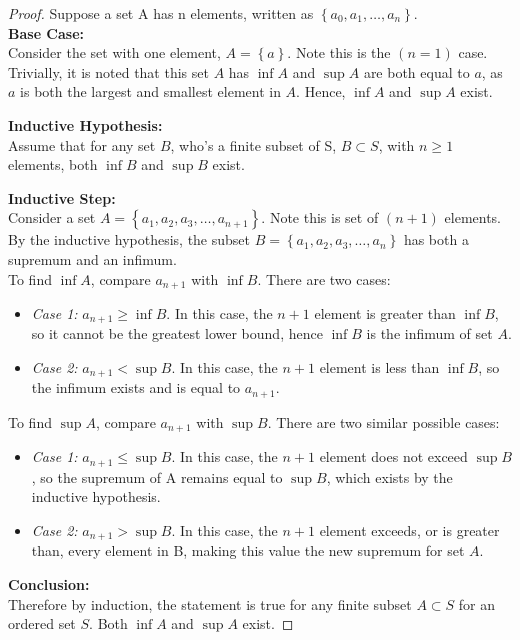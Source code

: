 \documentclass[12pt]{article}
\newcommand{\set}[1]{\left\{ {#1} \right\}}
\begin{document}
\begin{proof}
Suppose a set A has n elements, written as $\set{a_0, a_1, \dots, a_n}$. \\

\textbf{Base Case:} \\
Consider the set with one element, $A=\set{a}$. Note this is the $(n=1)$ case. Trivially, it is noted that this set $A$ has $\inf A$ and $\sup A$ are both equal to $a$, as $a$ is both the largest and smallest element in $A$. Hence, $\inf A$ and $\sup A$ exist.

\textbf{Inductive Hypothesis:} \\
Assume that for any set $B$, who's a finite subset of S, $B\subset S$, with $n\ge1$ elements, both $\inf B$ and $\sup B$ exist.

\textbf{Inductive Step:} \\
Consider a set $A=\set{a_1, a_2, a_3, \dots, a_{n+1}}$. Note this is set of $(n+1)$ elements. By the inductive hypothesis, the subset $B=\set{a_1, a_2, a_3, \dots, a_n}$ has both a supremum and an infimum. \\

\noindent To find $\inf A$, compare $a_{n+1}$ with $\inf B$. There are two  cases:

\begin{itemize}
\item \textit{Case 1:} $a_{n+1} \ge \inf B$. In this case, the $n+1$ element is greater than $\inf B$, so it cannot be the greatest lower bound, hence $\inf B$ is the infimum of set $A$.

\item \textit{Case 2:} $a_{n+1} < \sup B$. In this case, the 	$n+1$ element is less than $\inf B$, so the infimum exists and is equal to $a_{n+1}$. 
\end{itemize}

\noindent To find $\sup A$, compare $a_{n+1}$ with $\sup B$. There are two similar possible cases:

\begin{itemize}
\item \textit{Case 1:} $a_{n+1} \le \sup B$. In this case, the $n+1$ element does not exceed $\sup B$, so the supremum of A remains equal to $\sup B$, which exists by the inductive hypothesis.

\item \textit{Case 2:} $a_{n+1} > \sup B$. In this case, the $n+1$ element exceeds, or is greater than, every element in B, making this value the new supremum for set $A$.
\end{itemize}

\textbf{Conclusion:} \\
Therefore by induction, the statement is true for any finite subset $A\subset S$ for an ordered set $S$. Both $\inf A$ and $\sup A$ exist.
\end{proof}
\end{document}
